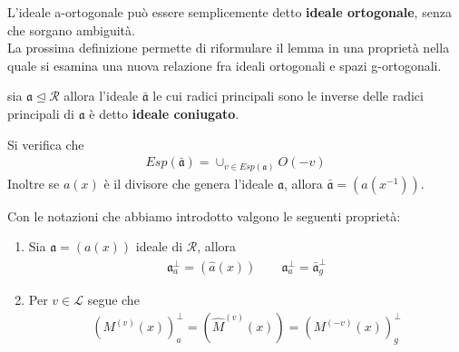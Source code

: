 L'ideale a-ortogonale può essere semplicemente detto {\bf ideale ortogonale}, senza che sorgano ambiguità. \\
La prossima definizione permette di riformulare il lemma in una proprietà nella quale si esamina una nuova relazione fra ideali ortogonali e spazi g-ortogonali.
\begin{definizione}
   sia $\mathfrak{a} \trianglelefteq \mathcal{R}$ allora l'ideale $\bar{\mathfrak{a}}$ le cui radici principali sono le inverse delle radici principali di $\mathfrak{a}$ è detto {\bf ideale coniugato}.
\end{definizione}
\begin{osservazione}
   Si verifica che
   \begin{align*}
      Esp(\bar{\mathfrak{a}}) = \cup_{v \in Esp(\mathfrak{a}) } O(-v)
   \end{align*}
   Inoltre se $a(x)$ è il divisore che genera l'ideale $\mathfrak{a}$, allora $\bar{\mathfrak{a}} = (a(x^{-1}))$.
\end{osservazione}
\begin{prop}\label{prop:IdOrtogonali}
   Con le notazioni che abbiamo introdotto valgono le seguenti proprietà:
   \begin{enumerate}
      \item Sia $\mathfrak{a} = (a(x))$ ideale di $\mathcal{R}$, allora
      \begin{align*}
         \mathfrak{a}_{a}^{\perp} = (\hat{a}(x)) \qquad  \mathfrak{a}_{a}^{\perp} = \bar{\mathfrak{a}}_{g}^{\perp}
      \end{align*}
      \item Per $v \in \mathscr{L}$ segue che
      \begin{align*}
           (M^{(v)}(x))_{a}^{\perp} = (\hat{M}^{(v)}(x)) = (M^{(-v)}(x))_{g}^{\perp}
      \end{align*}
   \end{enumerate}
\end{prop}
